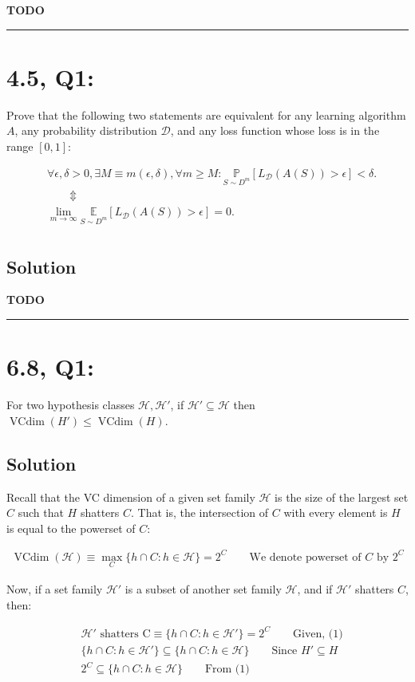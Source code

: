 \documentclass[11pt]{article}
\newcommand{\D}{\ensuremath{\mathcal{D}}}
\renewcommand{\H}{\ensuremath{\mathcal{H}}}
\DeclareMathOperator{\vcdim}{VCdim}
\newcommand{\Vcdim}{\ensuremath{\vcdim}}
\begin{document}
\textbf{TODO}


\rule{\textwidth}{1pt}

\section*{4.5, Q1:}
Prove that the following two statements are equivalent for any learning
algorithm $A$, any probability distribution $\D$, and any loss function
whose loss is in the range $[0, 1]$:

\begin{align*}
    &\forall \epsilon, \delta > 0, \exists M \equiv m(\epsilon, \delta), \forall m \geq M :
    \underset{S \sim D^m }{\mathbb P}[L_\D(A(S)) > \epsilon] < \delta. \\
    & \qquad \Updownarrow \\
    &\lim_{m \rightarrow \infty} \underset{S \sim D^m }{\mathbb E}[L_\D(A(S)) > \epsilon] = 0. \\
\end{align*}

\subsection*{Solution}

\textbf{TODO}

\rule{\textwidth}{1pt}


\section*{6.8, Q1:} For two hypothesis classes $\H, \H'$, if $\H' \subseteq \H$
then $\vcdim(H') \leq \vcdim(H)$.
\subsection*{Solution}
Recall that the VC dimension of a given set family $\H$ is the size of
the largest set $C$ such that $H$ shatters $C$. That is, the intersection of $C$
with every element is $H$ is equal to the powerset of $C$:

\begin{align*}
\Vcdim(\H) \equiv \max_{C} \{ h \cap C : h \in \H \} = 2^C \qquad \text{We denote powerset of $C$ by $2^C$ }
\end{align*}

Now, if a set family $\H'$ is a subset of another set family $\H$, and if $\H'$
shatters $C$, then:

\begin{align*}
    &\H' \text{ shatters C} \equiv  \{ h \cap C : h \in \H'\} = 2^C \qquad \text{Given, (1)}\\
    &\{ h \cap C : h \in \H' \} \subseteq \{ h \cap C : h \in \H \} \qquad \text{Since $H' \subseteq H$} \\
    &2^C \subseteq \{ h \cap C : h \in \H \}  \qquad \text{From (1)} \\
\end{align*}
\end{document}
